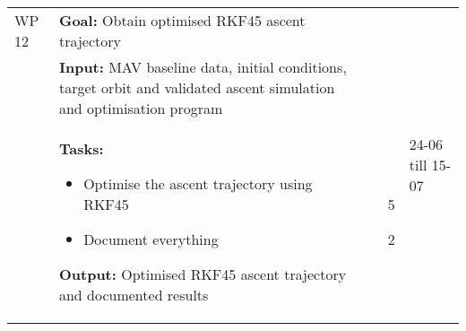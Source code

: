 \begin{longtable}{|p{2cm}|p{10cm}|p{1cm}|p{1cm}|}
WP 12 & \textbf{Goal:} Obtain optimised \ac{RKF45} ascent trajectory &  & \multirow{3}{1cm}{24-06 till 15-07}  \\ 
&\textbf{Input:} MAV baseline data, initial conditions, target orbit and validated ascent simulation and optimisation program & & \\
& \textbf{Tasks:}
\begin{itemize}
\item Optimise the ascent trajectory using \ac{RKF45}
\item Document everything
\end{itemize} 
\textbf{Output:} Optimised \ac{RKF45} ascent trajectory and documented results & \noindent \begin{itemize}[leftmargin=*]
\item[5] 
\item[2]
\end{itemize} & \\ \hline


\end{longtable}

